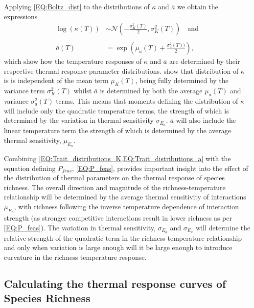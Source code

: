 \documentclass{article}
\begin{document}
Applying \cref{EQ:Boltz_dist} to the distributions of $\kappa$ and $\bar{a}$ we obtain the expressions
\begin{align} 
        \log(\kappa(T)) &\sim \mathcal{N}\left( -\frac{\sigma_{K}^2(T)}{2} , \sigma_{K}^2(T) \right) \quad \text{and} \label{EQ:Trait_distributions_K} \\ \nonumber \\
        \bar{a}(T) &= \exp \left(\mu_a(T) + \frac{\sigma_a^2(T))}{2} \right) \label{EQ:Trait_distributions_a},
\end{align}
which show how the temperature responses of $\kappa$ and $\bar{a}$ are determined by their respective thermal response parameter distributions.  show that distribution of $\kappa$ is is independent of the mean term $\mu_{K}(T)$, being fully determined by the variance term $\sigma_{K}^2(T)$ whilst $\bar{a}$ is determined by both the average $\mu_a(T)$ and variance $\sigma_a^2(T)$ terms. This means that moments defining the distribution of $\kappa$ will include only the quadratic temperature terms, the strength of which is determined by the variation in thermal sensitivity $\sigma_{E_{\kappa}}$. $\bar{a}$ will also include the linear temperature term the strength of which is determined by the average thermal sensitivity, $\mu_{E_a}$. 

Combining \cref{EQ:Trait_distributions_K,EQ:Trait_distributions_a} with the equation defining $P_{feas}$, \cref{EQ:P_feas}, provides important insight into the effect of the distribution of thermal parameters on the thermal response of species richness. The overall direction and magnitude of the richness-temperature relationship will be determined by the average thermal sensitivity of interactions $\mu_{E_a}$, with richness following the inverse temperature dependence of interaction strength (as stronger competitive interactions result in lower richness as per \cref{EQ:P_feas}). The variation in thermal sensitivity, $\sigma_{E_a}$ and $\sigma_{E_{\kappa}}$ will determine the relative strength of the quadratic term in the richness temperature relationship and only when variation is large enough will it be large enough to introduce curvature in the richness temperature response.


\subsection*{Calculating the thermal response curves of Species Richness} \label{SEC:Temp_SP_num}
\end{document}
